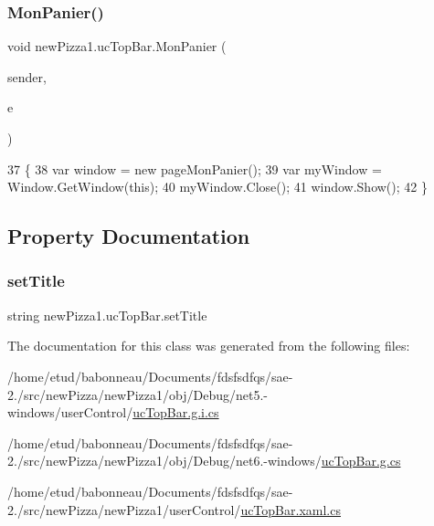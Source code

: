 \subsubsection{\texorpdfstring{Mon\+Panier()}{MonPanier()}}
{\footnotesize\ttfamily void new\+Pizza1.\+uc\+Top\+Bar.\+Mon\+Panier (\begin{DoxyParamCaption}\item[{object}]{sender,  }\item[{Routed\+Event\+Args}]{e }\end{DoxyParamCaption})\hspace{0.3cm}{\ttfamily [inline]}}


\begin{DoxyCode}
37         \{
38             var window = \textcolor{keyword}{new} pageMonPanier();
39             var myWindow = Window.GetWindow(\textcolor{keyword}{this});
40             myWindow.Close();
41             window.Show();
42         \}
\end{DoxyCode}


\subsection{Property Documentation}
\mbox{\label{classnewPizza1_1_1ucTopBar_ad3df1844a240f0e6154fb426648f5260}} 
\subsubsection{\texorpdfstring{set\+Title}{setTitle}}
{\footnotesize\ttfamily string new\+Pizza1.\+uc\+Top\+Bar.\+set\+Title\hspace{0.3cm}{\ttfamily [set]}}



The documentation for this class was generated from the following files\+:\begin{DoxyCompactItemize}
\item 
/home/etud/babonneau/\+Documents/fdsfsdfqs/sae-\/2./src/new\+Pizza/new\+Pizza1/obj/\+Debug/net5.-\/windows/user\+Control/\hyperlink{net5_80-windows_2userControl_2ucTopBar_8g_8i_8cs}{uc\+Top\+Bar.\+g.\+i.\+cs}\item 
/home/etud/babonneau/\+Documents/fdsfsdfqs/sae-\/2./src/new\+Pizza/new\+Pizza1/obj/\+Debug/net6.-\/windows/\hyperlink{Debug_2net6_80-windows_2ucTopBar_8g_8cs}{uc\+Top\+Bar.\+g.\+cs}\item 
/home/etud/babonneau/\+Documents/fdsfsdfqs/sae-\/2./src/new\+Pizza/new\+Pizza1/user\+Control/\hyperlink{ucTopBar_8xaml_8cs}{uc\+Top\+Bar.\+xaml.\+cs}\end{DoxyCompactItemize}
